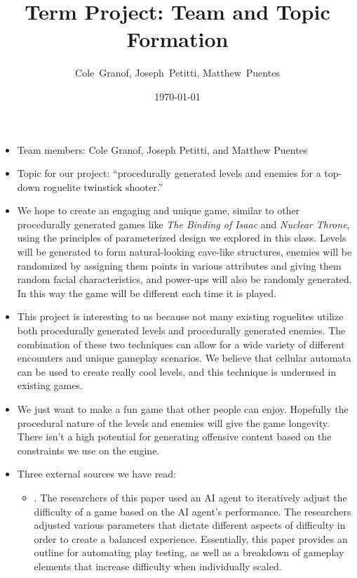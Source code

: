 \documentclass[a4paper, 10pt, american]{article}
\title{Term Project: Team and Topic Formation}
\author{Cole~Granof, Joseph~Petitti, Matthew~Puentes}
\date{\today}
\begin{document}
\maketitle

\begin{itemize}
	\item Team members: Cole Granof, Joseph Petitti, and Matthew Puentes
	\item Topic for our project: ``procedurally generated levels and enemies for
		a top-down roguelite twinstick shooter.''
	\item We hope to create an engaging and unique game, similar to other
		procedurally generated games like \textit{The Binding of Isaac} and
		\textit{Nuclear Throne}, using the principles of parameterized design we
		explored in this class. Levels will be generated to form natural-looking
		cave-like structures, enemies will be randomized by assigning them
		points in various attributes and giving them random facial
		characteristics, and power-ups will also be randomly generated. In this
		way the game will be different each time it is played.
	\item This project is interesting to us because not many existing roguelites
		utilize both procedurally generated levels and procedurally generated
		enemies. The combination of these two techniques can allow for a wide
		variety of different encounters and unique gameplay scenarios. We
		believe that cellular automata can be used to create really cool levels,
		and this technique is underused in existing games.
	\item We just want to make a fun game that other people can enjoy. Hopefully
		the procedural nature of the levels and enemies will give the game
		longevity. There isn't a high potential for generating offensive content
		based on the constraints we use on the engine.
	\item Three external sources we have read:
		\begin{itemize}
			\item \cite{liu2017}. The researchers of this paper used an AI agent
				to iteratively adjust the difficulty of a game based on the AI
				agent's performance. The researchers adjusted various parameters
				that dictate different aspects of difficulty in order to create
				a balanced experience. Essentially, this paper provides an
				outline for automating play testing, as well as a breakdown of
				gameplay elements that increase difficulty when individually
				scaled.


\end{itemize}
\end{itemize}
\end{document}

